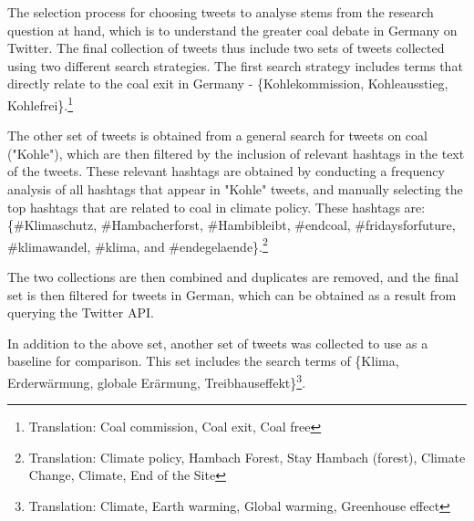 \documentclass[10pt,twocolumn,twoside]{layout}
\begin{document}


The selection process for choosing tweets to analyse stems from the research question at hand, which is to understand the greater coal debate in Germany on Twitter. The final collection of tweets thus include two sets of tweets collected using two different search strategies. The first search strategy includes terms that directly relate to the coal exit in Germany - \{Kohlekommission, Kohleausstieg, Kohlefrei\}.\footnote{Translation: Coal commission, Coal exit, Coal free}

The other set of tweets is obtained from a general search for tweets on coal ("Kohle"), which are then filtered by the inclusion of relevant hashtags in the text of the tweets. These relevant hashtags are obtained by conducting a frequency analysis of all hashtags that appear in "Kohle" tweets, and manually selecting the top hashtags that are related to coal in climate policy. These hashtags are:  \{\#Klimaschutz, \#Hambacherforst, \#Hambibleibt, \#endcoal, \#fridaysforfuture, \#klimawandel, \#klima, and \#endegelaende\}.\footnote{Translation: Climate policy, Hambach Forest, Stay Hambach (forest), Climate Change, Climate, End of the Site} 

The two collections are then combined and duplicates are removed, and the final set is then filtered for tweets in German, which can be obtained as a result from querying the Twitter API. 

In addition to the above set, another set of tweets was collected to use as a baseline for comparison. This set includes the search terms of \{Klima, Erderwärmung, globale Erärmung, Treibhauseffekt\}\footnote{Translation: Climate, Earth warming, Global warming, Greenhouse effect}.
\end{document}
